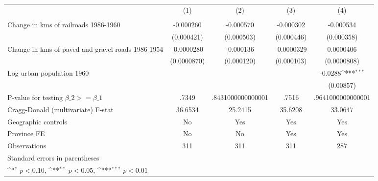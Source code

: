 {
\def\sym#1{\ifmmode^{#1}\else\(^{#1}\)\fi}
\begin{tabular}{l*{4}{c}}
\hline\hline
                &\multicolumn{1}{c}{(1)}&\multicolumn{1}{c}{(2)}&\multicolumn{1}{c}{(3)}&\multicolumn{1}{c}{(4)}\\
                &\multicolumn{1}{c}{}&\multicolumn{1}{c}{}&\multicolumn{1}{c}{}&\multicolumn{1}{c}{}\\
\hline
Change in kms of railroads 1986-1960&-0.000260         &-0.000570         &-0.000302         &-0.000534         \\
                &(0.000421)         &(0.000503)         &(0.000446)         &(0.000358)         \\
[1em]
Change in kms of paved and gravel roads 1986-1954&-0.0000280         &-0.000136         &-0.0000329         &0.0000406         \\
                &(0.0000870)         &(0.000120)         &(0.000103)         &(0.0000808)         \\
[1em]
Log urban population 1960&                  &                  &                  &  -0.0288\sym{***}\\
                &                  &                  &                  &(0.00857)         \\
\hline
P-value for testing $\beta\_{2} >= \beta\_{1}$&    .7349         &.8431000000000001         &    .7516         &.9641000000000001         \\
Cragg-Donald (multivariate) F-stat&  36.6534         &  25.2415         &  35.6208         &  33.0647         \\
Geographic controls&       No         &      Yes         &      Yes         &      Yes         \\
Province FE     &       No         &       No         &      Yes         &      Yes         \\
Observations    &      311         &      311         &      311         &      287         \\
\hline\hline
\multicolumn{5}{l}{\footnotesize Standard errors in parentheses}\\
\multicolumn{5}{l}{\footnotesize \sym{*} \(p<0.10\), \sym{**} \(p<0.05\), \sym{***} \(p<0.01\)}\\
\end{tabular}
}
